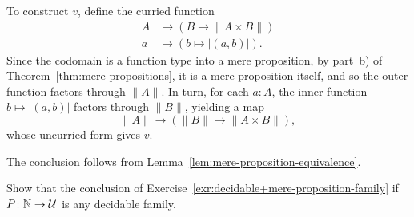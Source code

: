 \begin{solution}
    To construct $v$, define the curried function
    \begin{align*}
        A&\to(B\to\lVert A\times B\rVert)\\
        a&\mapsto(b\mapsto\lvert(a,b)\rvert).
    \end{align*}
    Since the codomain is a function type into a mere proposition, by part~b) of Theorem~\ref{thm:mere-propositions}, it is a mere proposition itself, and so the outer function factors through $\lVert A\rVert$. In turn, for each $a\colon A$, the inner function $b\mapsto\lvert(a,b)\rvert$ factors through $\lVert B\rVert$, yielding a map
    \[
        \lVert A\rVert\to(\lVert B\rVert\to\lVert A\times B\rVert),
    \]
    whose uncurried form gives $v$.
    
    The conclusion follows from Lemma~\ref{lem:mere-proposition-equivalence}.
    
\end{solution}

\begin{exr}\fe\label{exr:decidable-family}
    Show that the conclusion of\/ {\upshape Exercise~\ref{exr:decidable+mere-proposition-family}} if $P\colon\N\to\univ$ is any decidable family.
\end{exr}

